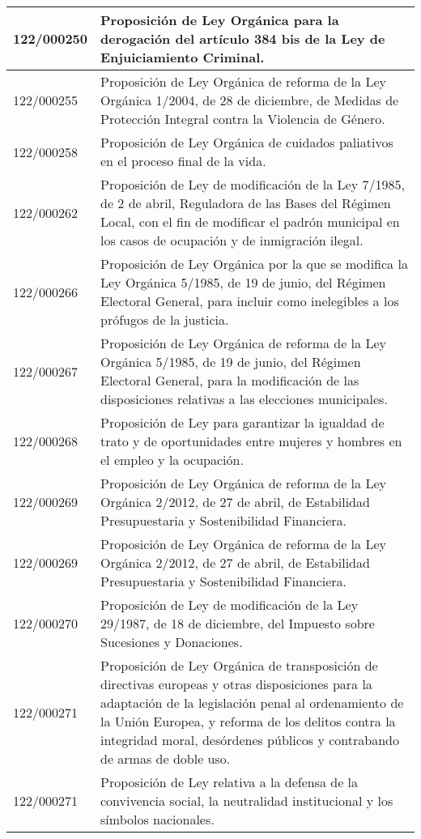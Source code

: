 {\begin{table}[H]
\begin{center}
\begin{tabularx}{\linewidth}{| l | X |}
\hline
122/000250 & Proposición de Ley Orgánica para la derogación del artículo 384 bis de la Ley de Enjuiciamiento Criminal. \\
\hline
122/000255 & Proposición de Ley Orgánica de reforma de la Ley Orgánica 1/2004, de 28 de diciembre, de Medidas de Protección Integral contra la Violencia de Género. \\
\hline
122/000258 & Proposición de Ley Orgánica de cuidados paliativos en el proceso final de la vida. \\
\hline
122/000262 & Proposición de Ley de modificación de la Ley 7/1985, de 2 de abril, Reguladora de las Bases del Régimen Local, con el fin de modificar el padrón municipal en los casos de ocupación y de inmigración ilegal. \\
\hline
122/000266 & Proposición de Ley Orgánica por la que se modifica la Ley Orgánica 5/1985, de 19 de junio, del Régimen Electoral General, para incluir como inelegibles a los prófugos de la justicia. \\
\hline
122/000267 & Proposición de Ley Orgánica de reforma de la Ley Orgánica 5/1985, de 19 de junio, del Régimen Electoral General, para la modificación de las disposiciones relativas a las elecciones municipales. \\
\hline
122/000268 & Proposición de Ley para garantizar la igualdad de trato y de oportunidades entre mujeres y hombres en el empleo y la ocupación. \\
\hline
122/000269 & Proposición de Ley Orgánica de reforma de la Ley Orgánica 2/2012, de 27 de abril, de Estabilidad Presupuestaria y Sostenibilidad Financiera. \\
\hline
122/000269 & Proposición de Ley Orgánica de reforma de la Ley Orgánica 2/2012, de 27 de abril, de Estabilidad Presupuestaria y Sostenibilidad Financiera. \\
\hline
122/000270 & Proposición de Ley de modificación de la Ley 29/1987, de 18 de diciembre, del Impuesto sobre Sucesiones y Donaciones. \\
\hline
122/000271 & Proposición de Ley Orgánica de transposición de directivas europeas y otras disposiciones para la adaptación de la legislación penal al ordenamiento de la Unión Europea, y reforma de los delitos contra la integridad moral, desórdenes públicos y contrabando de armas de doble uso. \\
\hline
122/000271 & Proposición de Ley relativa a la defensa de la convivencia social, la neutralidad institucional y los símbolos nacionales. \\

\end{tabularx}
\end{center}
\end{table}}

